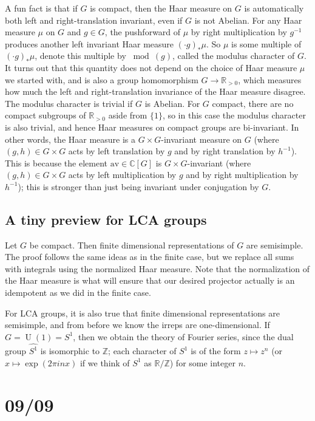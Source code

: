 \documentclass[11pt,leqno]{article}
\theoremstyle{plain}
\theoremstyle{definition}
\numberwithin{equation}{section}
\numberwithin{lem}{section}
\DeclareMathOperator{\U}{U}
\newcommand{\av}{\mathrm{av}}
\begin{document}
A fun fact is that if $G$ is compact, then the Haar measure on $G$ is automatically both left and right-translation invariant, even if $G$ is not Abelian. For any Haar measure $\mu$ on $G$ and $g\in G$, the pushforward of $\mu$ by right multiplication by $g^{-1}$ produces another left invariant Haar measure $(\cdot g)_\ast\mu$. So $\mu$ is some multiple of $(\cdot g)_\ast\mu$, denote this multiple by $\bmod(g)$, called the modulus character of $G$. It turns out that this quantity does not depend on the choice of Haar measure $\mu$ we started with, and is also a group homomorphism $G\to \mathbb R_{>0}$, which measures how much the left and right-translation invariance of the Haar measure disagree. The modulus character is trivial if $G$ is Abelian. For $G$ compact, there are no compact subgroups of $\mathbb R_{>0}$ aside from $\{1\}$, so in this case the modulus character is also trivial, and hence Haar measures on compact groups are bi-invariant. In other words, the Haar measure is a $G\times G$-invariant measure on $G$ (where $(g,h)\in G\times G$ acts by left translation by $g$ and by right translation by $h^{-1}$). This is because the element $\av\in\mathbb C[G]$ is $G\times G$-invariant (where $(g,h)\in G\times G$ acts by left multiplication by $g$ and by right multiplication by $h^{-1}$); this is stronger than just being invariant under conjugation by $G$.

\subsection{A tiny preview for LCA groups}
Let $G$ be compact. Then finite dimensional representations of $G$ are semisimple. The proof follows the same ideas as in the finite case, but we replace all sums with integrals using the normalized Haar measure. Note that the normalization of the Haar measure is what will ensure that our desired projector actually is an idempotent as we did in the finite case.

For LCA groups, it is also true that finite dimensional representations are semisimple, and from before we know the irreps are one-dimensional. If $G = \U(1) = S^1$, then we obtain the theory of Fourier series, since the dual group $\widehat{S^1}$ is isomorphic to $\mathbb Z$; each character of $S^1$ is of the form $z\mapsto z^n$ (or $x\mapsto \exp(2\pi i nx)$ if we think of $S^1$ as $\mathbb R/\mathbb Z$) for some integer $n$.

\newpage\section{09/09}
\end{document}
